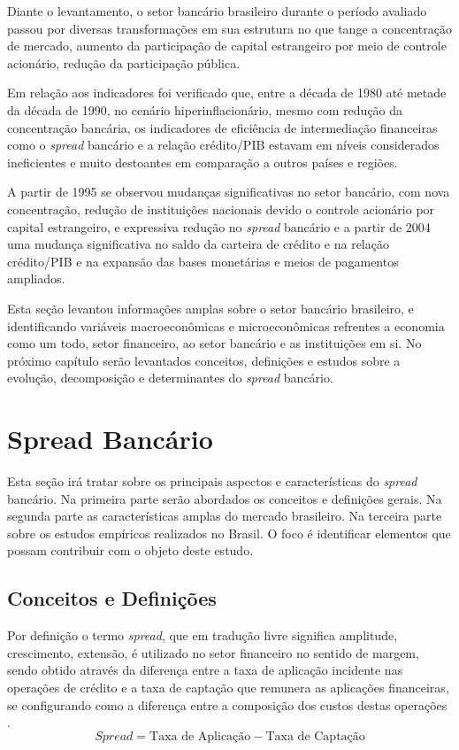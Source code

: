 \documentclass[12pt,12pt,openright,oneside,a4paper,chapter=TITLE,section=TITLE,subsection=TITLE,subsubsection=TITLE,english,french,spanish,portugues,sumario=tradicional]{abntex2}
\begin{document}
Diante o levantamento, o setor bancário brasileiro durante o período avaliado
passou por diversas transformações em sua estrutura no que tange a concentração
de mercado, aumento da participação de capital estrangeiro por meio de controle
acionário, redução da participação pública.

Em relação aos indicadores foi verificado que, entre a década de 1980 até metade da década de 1990, no cenário hiperinflacionário, mesmo com redução da
concentração bancária, os indicadores de eficiência de intermediação
financeiras como o \emph{spread} bancário e a relação crédito/PIB estavam em níveis
considerados ineficientes e muito destoantes em comparação a outros países e
regiões.

A partir de 1995 se observou mudanças significativas no setor bancário, com
nova concentração, redução de instituições nacionais devido o controle
acionário por capital estrangeiro, e expressiva redução no \emph{spread} bancário e
a partir de 2004 uma mudança significativa no saldo da carteira de crédito e na relação crédito/PIB e na expansão das bases monetárias e meios de pagamentos ampliados.

Esta seção levantou informações amplas sobre o setor bancário brasileiro, e
identificando variáveis macroeconômicas e microeconômicas refrentes a economia como um todo, setor financeiro, ao setor bancário e as instituições em si. No próximo capítulo serão levantados conceitos, definições e estudos sobre a evolução, decomposição e determinantes do \emph{spread} bancário.

\textual
\pagestyle{simple}

\section{Spread Bancário}

Esta seção irá tratar sobre os principais aspectos e características do
\emph{spread} bancário. Na primeira parte serão abordados os conceitos e definições
gerais. Na segunda parte as características amplas do mercado brasileiro. Na
terceira parte sobre os estudos empíricos realizados no Brasil. O foco é
identificar elementos que possam contribuir com o objeto deste estudo.

\subsection{Conceitos e Definições}

Por definição o termo \emph{spread}, que em tradução livre significa amplitude, crescimento, extensão, é utilizado no setor financeiro no sentido de margem, sendo obtido através da diferença entre a taxa de aplicação incidente nas operações de crédito e a taxa de captação que remunera as aplicações financeiras, se configurando como a diferença entre a composição dos custos destas operações \cite{BCB:2000}.
\[
Spread = \text{Taxa de Aplicação} - \text{Taxa de Captação}
\]
\end{document}
